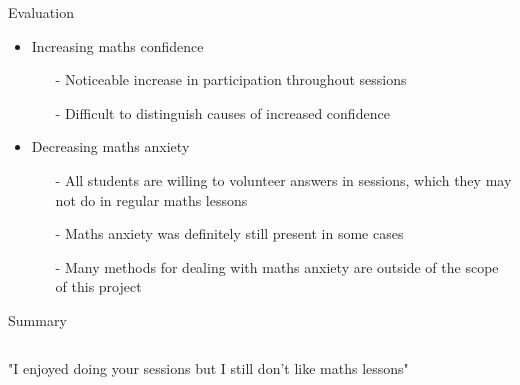 \documentclass{beamer}  %
\begin{document}
\begin{frame}{Evaluation}
    \begin{itemize}
        \item Increasing maths confidence
        \begin{itemize}
            \item[-] Noticeable increase in participation throughout sessions
            \item[-] Difficult to distinguish causes of increased confidence
        \end{itemize}
        \item Decreasing maths anxiety
        \begin{itemize}
            \item[-] All students are willing to volunteer answers in sessions, which they may not do in regular maths lessons
            \item[-] Maths anxiety was definitely still present in some cases 
            \item[-] Many methods for dealing with maths anxiety are outside of the scope of this project
        \end{itemize}
    \end{itemize}


\end{frame}

\begin{frame}{Summary}
    \begin{columns}
            "I enjoyed doing your sessions but I still don't like maths lessons"
    \end{columns}
\end{frame}
\end{document}
